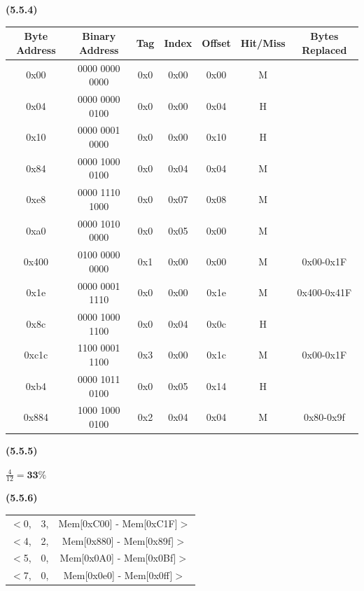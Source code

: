 \documentclass[11pt]{article}
\renewcommand\part[1]{\vspace{.10in}\textbf{(#1)}\par}
\begin{document}
	\part{5.5.4}
		\begin{center}
			\begin{tabular}{|c|c|c|c|c|c|c|}
				\hline
				Byte Address & Binary Address & Tag & Index & Offset & Hit/Miss & Bytes Replaced\\
				\hline
				0x00 & 0000 0000 0000 & 0x0 & 0x00 & 0x00 & M &\\
				\hline
				0x04 & 0000 0000 0100 & 0x0 & 0x00 & 0x04 & H &\\
				\hline
				0x10 & 0000 0001 0000 & 0x0 & 0x00 & 0x10 & H &\\
				\hline
				0x84 & 0000 1000 0100 & 0x0 & 0x04 & 0x04 & M &\\
				\hline
				0xe8 & 0000 1110 1000 & 0x0 & 0x07 & 0x08 & M &\\
				\hline
				0xa0 & 0000 1010 0000 & 0x0 & 0x05 & 0x00 & M&\\
				\hline
				0x400 & 0100 0000 0000 & 0x1 & 0x00 & 0x00 & M & 0x00-0x1F\\
				\hline
				0x1e & 0000 0001 1110 & 0x0 & 0x00 & 0x1e & M & 0x400-0x41F\\
				\hline
				0x8c & 0000 1000 1100 & 0x0 & 0x04 & 0x0c & H &\\
				\hline
				0xc1c & 1100 0001 1100 & 0x3 & 0x00 & 0x1c & M & 0x00-0x1F\\
				\hline
				0xb4 & 0000 1011 0100 & 0x0 & 0x05 & 0x14 & H &\\
				\hline
				0x884 & 1000 1000 0100 & 0x2 & 0x04 & 0x04 & M & 0x80-0x9f\\
				\hline
			\end{tabular}
		\end{center}\par
	
	\part{5.5.5}
		$\frac{4}{12}=\textbf{33\%}$\par
	
	\part{5.5.6}
		\begin{tabular}{*3c}
			$<$0, & 3, & Mem[0xC00] - Mem[0xC1F]$>$\\
			$<$4, & 2, & Mem[0x880] - Mem[0x89f]$>$\\
			$<$5, & 0, & Mem[0x0A0] - Mem[0x0Bf]$>$\\
			$<$7, & 0, & Mem[0x0e0] - Mem[0x0ff]$>$\\
		\end{tabular}\par
	
\end{document}
